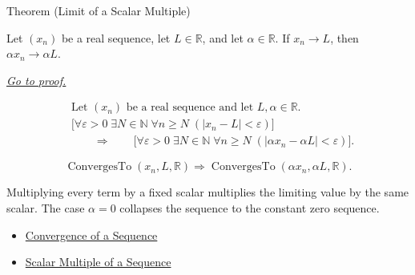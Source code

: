 
\begin{theorembox}{Theorem (Limit of a Scalar Multiple)}
\begin{theorem}
\label{thm:limit-of-scalar-multiple}
Let $(x_n)$ be a real sequence, let $L\in\mathbb{R}$, and let
$\alpha\in\mathbb{R}$. If $x_n\to L$, then $\alpha x_n\to \alpha L$.

\smallskip
\noindent
\hyperref[prf:limit-of-scalar-multiple]{\textit{Go to proof.}}
\end{theorem}
\end{theorembox}

\begin{remark*}
\[
\begin{aligned}
&\text{Let } (x_n) \text{ be a real sequence and let }
  L,\alpha\in\mathbb{R}.\\
&\bigl[
\forall \varepsilon>0\;\exists N\in\mathbb{N}\;\forall n\ge N\;
(|x_n-L|<\varepsilon)
\bigr]\\
&\qquad\Longrightarrow\qquad
\bigl[
\forall \varepsilon>0\;\exists N\in\mathbb{N}\;\forall n\ge N\;
(|\alpha x_n-\alpha L|<\varepsilon)
\bigr].
\end{aligned}
\]
\end{remark*}

\begin{remark*}
\[
\operatorname{ConvergesTo}(x_n,L,\mathbb{R})
\Longrightarrow
\operatorname{ConvergesTo}(\alpha x_n,\alpha L,\mathbb{R}).
\]
\end{remark*}

\begin{remark*}[Interpretation]
Multiplying every term by a fixed scalar multiplies the limiting value by the
same scalar. The case $\alpha=0$ collapses the sequence to the constant zero
sequence.
\end{remark*}

\begin{dependencies}
\begin{itemize}
  \item \hyperref[def:convergent-sequence]{Convergence of a Sequence}
  \item \hyperref[def:scalar-multiple-sequence]{Scalar Multiple of a Sequence}
\end{itemize}
\end{dependencies}


